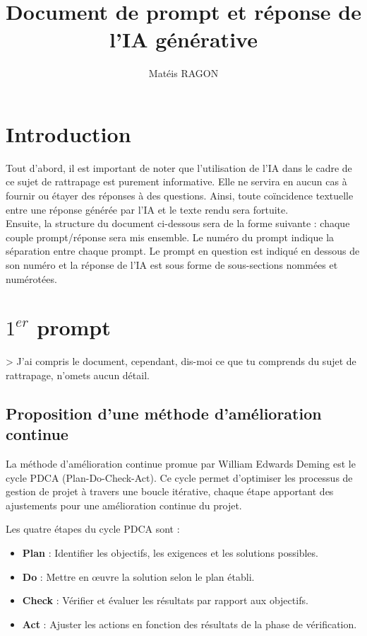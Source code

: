 \documentclass[titlepage]{article}
\title{Document de prompt et réponse de l'IA générative}
\author{Matéis RAGON}
\begin{document}
	\begin{titlepage}
		\maketitle
	\end{titlepage}

	\tableofcontents

	\clearpage

	\section{Introduction}

	Tout d'abord, il est important de noter que l'utilisation de l'IA dans le cadre de ce sujet de rattrapage est purement informative. Elle ne servira en aucun cas à fournir ou étayer des réponses à des questions. Ainsi, toute coïncidence textuelle entre une réponse générée par l'IA et le texte rendu sera fortuite. \\

	Ensuite, la structure du document ci-dessous sera de la forme suivante : chaque couple prompt/réponse sera mis ensemble. Le numéro du prompt indique la séparation entre chaque prompt. Le prompt en question est indiqué en dessous de son numéro et la réponse de l'IA est sous forme de sous-sections nommées et numérotées.  

	\section{$1^{er}$ prompt}
	
	> J'ai compris le document, cependant, dis-moi ce que tu comprends du sujet de rattrapage, n'omets aucun détail.
	
	\subsection{Proposition d'une méthode d'amélioration continue}
	La méthode d'amélioration continue promue par William Edwards Deming est le cycle PDCA (Plan-Do-Check-Act). Ce cycle permet d'optimiser les processus de gestion de projet à travers une boucle itérative, chaque étape apportant des ajustements pour une amélioration continue du projet.

	Les quatre étapes du cycle PDCA sont :
	\begin{itemize}
		\item \textbf{Plan} : Identifier les objectifs, les exigences et les solutions possibles.
		\item \textbf{Do} : Mettre en œuvre la solution selon le plan établi.
		\item \textbf{Check} : Vérifier et évaluer les résultats par rapport aux objectifs.
		\item \textbf{Act} : Ajuster les actions en fonction des résultats de la phase de vérification.
	\end{itemize}
\end{document}
